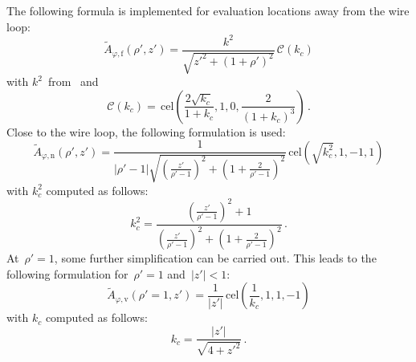The following formula is implemented for evaluation locations away from the wire loop:
\begin{equation}
  \tilde{A}_{\varphi,\mathrm{f}} (\rho',z')
  = \frac{k^2}{\sqrt{z'^2 + (1 + \rho')^2}} \,\mathcal{C}(k_c) \label{eqn:cwl_A_phi_f}
\end{equation}
with $k^2$~from~ and
\begin{equation}
  \mathcal{C}(k_c)
  = \,\mathrm{cel} \left( \frac{2 \sqrt{k_c}}{1 + k_c}, 1, 0, \frac{2}{(1 + k_c)^3} \right) \, . \label{eqn:elliptic_c}
\end{equation}
Close to the wire loop, the following formulation is used:
\begin{equation}
  \tilde{A}_{\varphi,\mathrm{n}} (\rho',z')
  = \frac{1}{|\rho' - 1| \sqrt{\left( \frac{z'}{\rho'-1} \right)^2 + \left(1 + \frac{2}{\rho'-1} \right)^2 }}
    \,\mathrm{cel}(\sqrt{k_c^2}, 1, -1, 1) \label{eqn:cwl_A_phi_n}
\end{equation}
with $k_c^2$ computed as follows:
\begin{equation}
  k_c^2 = \frac{\left( \frac{z'}{\rho'-1} \right)^2 + 1}{\left( \frac{z'}{\rho'-1} \right)^2 + \left(1 + \frac{2}{\rho'-1} \right)^2} \, .
\end{equation}
At~$\rho' = 1$, some further simplification can be carried out.
This leads to the following formulation for~$\rho' = 1$ and~$|z'| < 1$:
\begin{equation}
  \tilde{A}_{\varphi,\mathrm{v}} (\rho'=1, z') = \frac{1}{|z'|} \,\mathrm{cel}\left(\frac{1}{k_c}, 1, 1, -1\right) \label{eqn:cwl_A_phi_v}
\end{equation}
with $k_c$ computed as follows:
\begin{equation}
  k_c = \frac{|z'|}{\sqrt{4 + {z'}^2}} \, .
\end{equation}

